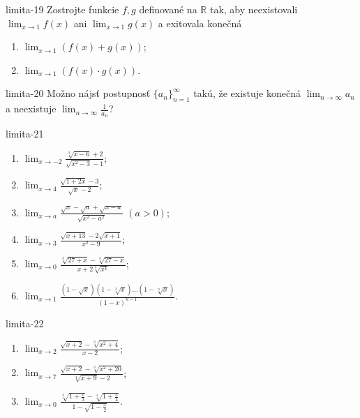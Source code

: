 \begin{defproblem}{limita-19}
Zostrojte funkcie $f,g$ definované na $\mathbb{R}$ tak, aby neexistovali $\lim_{x \rightarrow 1} f(x)$ ani $\lim_{x \rightarrow 1} g(x)$ a exitovala konečná
\begin{multicols}{2}
\begin{enumerate}
    \item $\lim_{{x \rightarrow 1}} (f(x)+g(x))$;
    \item $\lim_{{x \rightarrow 1}} (f(x) \cdot g(x))$.
\end{enumerate}
\end{multicols}
\end{defproblem}

\begin{defproblem}{limita-20}
Možno nájsť postupnosť ${\{a_n\}}_{n=1}^\infty$ takú, že existuje konečná $\lim_{n \rightarrow \infty} a_n$ a neexistuje $\lim_{n \rightarrow \infty} \frac{1}{a_n}$?
\end{defproblem}

\begin{defproblem}{limita-21}
\begin{multicols}{2}
\begin{enumerate}
    \item $\lim_{{x \rightarrow -2}} \frac{\sqrt[3]{x-6}+2}{\sqrt{x^2-3}-1}$;
    \item $\lim_{{x \rightarrow 4}} \frac{\sqrt{1+2x}-3}{\sqrt{x}-2}$;
    \item $\lim_{{x \rightarrow a}} \frac{\sqrt{x}-\sqrt{a}+\sqrt{x-a}}{\sqrt{x^2-a^2}}$ $(a>0)$;
    \item $\lim_{{x \rightarrow 3}} \frac{\sqrt{x+13}-2\sqrt{x+1}}{x^2-9}$;
    \item $\lim_{{x \rightarrow 0}} \frac{\sqrt[3]{27+x}-\sqrt[3]{27-x}}{x+2\sqrt[3]{x^4}}$;
    \item $\lim_{{x \rightarrow 1}} \frac{(1-\sqrt{x})(1-\sqrt[3]{x})...(1-\sqrt[n]{x})}{(1-x)^{n-1}}$.
\end{enumerate}
\end{multicols}
\end{defproblem}

\begin{defproblem}{limita-22}
\begin{enumerate}
\item $\lim_{x \rightarrow 2} \frac{\sqrt{x+2}-\sqrt[3]{x^2+4}}{x-2}$;
\item  $\lim_{x \rightarrow 7} \frac{\sqrt{x+2}-\sqrt[3]{x^2+20}}{\sqrt[4]{x+9}-2}$;
\item  $\lim_{x \rightarrow 0} \frac{\sqrt[3]{1+\frac{x}{3}}-\sqrt[4]{1+\frac{x}{4}}}{1-\sqrt{1-\frac{x}{2}}}$.
\end{enumerate}
\end{defproblem}


